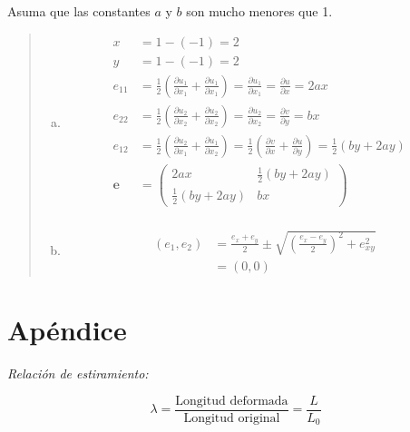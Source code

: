 \documentclass[a4paper,10pt,twoside,final,spanish]{article}
\begin{document}
Asuma que las constantes $a$ y $b$ son mucho menores que 1.

\dotfill

\begin{quote}

\begin{enumerate}[a.]

\item 

\begin{align*}
x &= 1-(-1)=2 \\
y &= 1-(-1)=2 \\
e_{11} &= \frac{1}{2}
\left(
\frac{\partial u_{1}}{\partial x_{1}}+\frac{\partial u_{1}}{\partial x_{1}}
\right)
= \frac{\partial u_{1}}{\partial x_{1}}=\frac{\partial u}{\partial x}=2ax & \\
e_{22} &= \frac{1}{2}
\left(
\frac{\partial u_{2}}{\partial x_{2}}+\frac{\partial u_{2}}{\partial x_{2}}
\right)
= \frac{\partial u_{2}}{\partial x_{2}}=\frac{\partial v}{\partial y}=bx & \\
e_{12} &= \frac{1}{2}
\left(
\frac{\partial u_{2}}{\partial x_{1}}+\frac{\partial u_{1}}{\partial x_{2}}
\right)
= \frac{1}{2}\left(
\frac{\partial v}{\partial x}+\frac{\partial u}{\partial y}\right) 
=\frac{1}{2}(by+2ay) \\ 
\mathbf{e} &= \begin{pmatrix}
2ax                 & \frac{1}{2}(by+2ay) \\
\frac{1}{2}(by+2ay) & bx
\end{pmatrix} \\
\end{align*}

\item 

\begin{align*}
(e_{1},e_{2}) &= \frac{e_{x}+e_{y}}{2}\pm
\sqrt{\left(\frac{e_{x}-e_{y}}{2}\right)^{2}+e_{xy}^{2}} \\
&= (0,0)
\end{align*}

\end{enumerate}

\end{quote} 

\section*{Apéndice}

\textit{Relación de estiramiento:}

\begin{equation}
\lambda=\frac{\text{Longitud deformada}}{\text{Longitud original}}=\frac{L}{L_{0}}
\end{equation}
\end{document}
